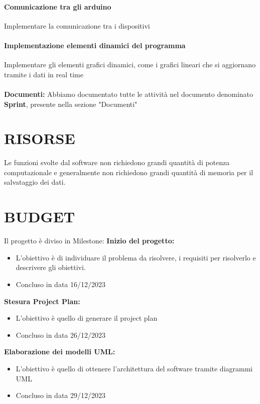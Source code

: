 \documentclass{report}
\begin{document}
\subsubsection{Comunicazione tra gli arduino}
Implementare la comunicazione tra i dispositivi 
\subsubsection{Implementazione elementi dinamici del programma}
Implementare gli elementi grafici dinamici, come i grafici lineari che si aggiornano tramite i dati in real time\\\\
\textbf{Documenti:} Abbiamo documentato tutte le attività nel documento denominato \textbf{Sprint}, presente nella sezione "Documenti" 

\chapter{RISORSE}
Le funzioni svolte dal software non richiedono grandi quantità di potenza computazionale e generalmente non richiedono grandi quantità di memoria per il salvataggio dei dati.\\

\begingroup
\let\clearpage\relax
\chapter{BUDGET}
\endgroup

Il progetto è diviso in Milestone:
\textbf{Inizio del progetto:} 
\begin{itemize}
\item L'obiettivo è di individuare il problema da risolvere, i requisiti per risolverlo e descrivere gli obiettivi.
\item Concluso in data 16/12/2023
\end{itemize}

\textbf{Stesura Project Plan:}
\begin{itemize}
\item L'obiettivo è quello di generare il project plan
\item Concluso in data 26/12/2023
\end{itemize}

\textbf{Elaborazione dei modelli UML:}
\begin{itemize}
\item L'obiettivo è quello di ottenere l'architettura del software tramite diagrammi UML
\item Concluso in data 29/12/2023
\end{itemize}
\end{document}
